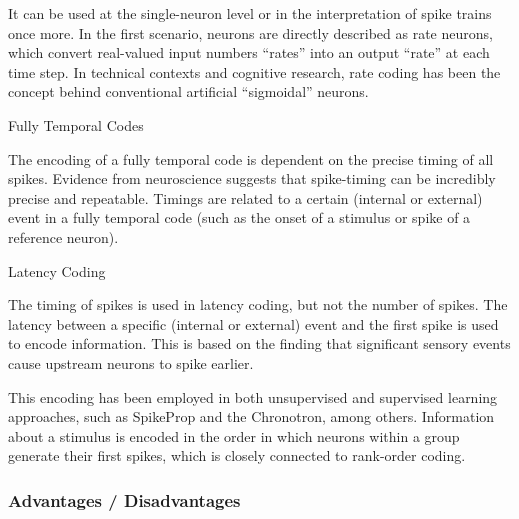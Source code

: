 \documentclass[11pt]{article}
\begin{document}
{  It can be used at the single-neuron level or in the interpretation of spike trains once more. In the first scenario, neurons are directly described as rate neurons, which convert real-valued input numbers  “rates”  into an output “rate” at each time step. In technical contexts and cognitive research, rate coding has been the concept behind conventional artificial “sigmoidal” neurons.

  Fully Temporal Codes

  The encoding of a fully temporal code is dependent on the precise timing of all spikes. Evidence from neuroscience suggests that spike-timing can be incredibly precise and repeatable. Timings are related to a certain (internal or external) event in a fully temporal code (such as the onset of a stimulus or spike of a reference neuron).

  Latency Coding

  The timing of spikes is used in latency coding, but not the number of spikes. The latency between a specific (internal or external) event and the first spike is used to encode information. This is based on the finding that significant sensory events cause upstream neurons to spike earlier.

  This encoding has been employed in both unsupervised and supervised learning approaches, such as SpikeProp and the Chronotron, among others. Information about a stimulus is encoded in the order in which neurons within a group generate their first spikes, which is closely connected to rank-order coding.
}


\subsubsection{Advantages / Disadvantages}
\end{document}
